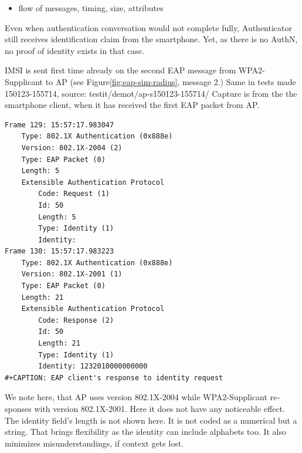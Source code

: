 \documentclass[12pt,a4paper,english]{tutthesis}
\begin{document}
\begin{otherlanguage}{english}
\begin{itemize}
\item flow of messages,  timing,  size, attributes
\end{itemize}

Even when authentication conversation would not complete fully,
Authenticator still receives identification claim from the smartphone. Yet, as
there is no AuthN, no proof of identity exists in that case.

IMSI is sent first time already on the second EAP message from 
WPA2-Supplicant to AP (see Figure\ref{fig:eap-sim-radius}, message 2.)
Same in tests made 150123-155714, source:
testit/demot/ap-s150123-155714/
Capture is from the the smartphone client, when it has received the first EAP
packet from AP.

\begin{verbatim}
Frame 129: 15:57:17.983047
    Type: 802.1X Authentication (0x888e)
    Version: 802.1X-2004 (2)
    Type: EAP Packet (0)
    Length: 5
    Extensible Authentication Protocol
        Code: Request (1)
        Id: 50
        Length: 5
        Type: Identity (1)
        Identity: 
Frame 130: 15:57:17.983223
    Type: 802.1X Authentication (0x888e)
    Version: 802.1X-2001 (1)
    Type: EAP Packet (0)
    Length: 21
    Extensible Authentication Protocol
        Code: Response (2)
        Id: 50
        Length: 21
        Type: Identity (1)
        Identity: 1232010000000000
#+CAPTION: EAP client's response to identity request
\end{verbatim}
We note here, that AP uses version 802.1X-2004 while WPA2-Supplicant responses with
version 802.1X-2001. Here it does not have any noticeable effect.
The identity field's length is not shown here.
It is not coded as a numerical but a string.
That brings flexibility as the identity can include alphabets too. It also minimizes misunderstandings,
if context gets lost.






\end{otherlanguage}
\end{document}
